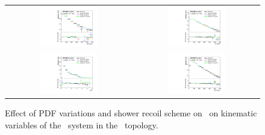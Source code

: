 \begin{figure}[p]
\begin{center}
\begin{tabular}{cc}
\includegraphics[width=0.48\textwidth]{Modeling/Figures/other_tt2bq_qq_m_norm} &
\includegraphics[width=0.48\textwidth]{Modeling/Figures/other_tt2bq_qq_pt_norm} \\
\includegraphics[width=0.48\textwidth]{Modeling/Figures/other_tt2bq_qq_dr_norm} &
\includegraphics[width=0.48\textwidth]{Modeling/Figures/other_tt2bq_qq_ht_norm} \\
\end{tabular}
\caption{Effect of PDF variations and shower recoil scheme  on \ShOL\ on kinematic variables of the \bbbar\ system in the \ttbb\ topology.}
\label{fig:other_tt2b_bb}
\end{center}
\end{figure}

